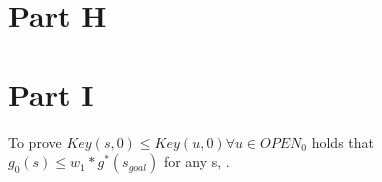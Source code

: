 \documentclass[12pt]{article}
\begin{document}
\section{Part H}


\section{Part I}
To prove \(Key(s,0) \leq Key(u,0) \forall u \in OPEN_0\) holds that \(g_0(s) \leq w_1*g^*(s_{goal})\) for any s, .
\end{document}
